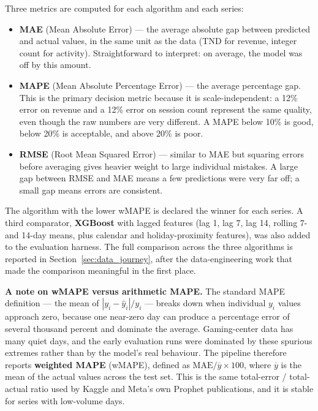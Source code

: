 Three metrics are computed for each algorithm and each series:

\begin{itemize}
  \item \textbf{MAE} (Mean Absolute Error) --- the average absolute gap between
        predicted and actual values, in the same unit as the data (TND for revenue,
        integer count for activity). Straightforward to interpret: on average, the
        model was off by this amount.
  \item \textbf{MAPE} (Mean Absolute Percentage Error) --- the average percentage gap.
        This is the primary decision metric because it is scale-independent: a 12\%
        error on revenue and a 12\% error on session count represent the same quality,
        even though the raw numbers are very different. A MAPE below 10\% is good,
        below 20\% is acceptable, and above 20\% is poor.
  \item \textbf{RMSE} (Root Mean Squared Error) --- similar to MAE but squaring errors
        before averaging gives heavier weight to large individual mistakes. A large gap
        between RMSE and MAE means a few predictions were very far off; a small gap
        means errors are consistent.
\end{itemize}

The algorithm with the lower wMAPE is declared the winner for each series. A third
comparator, \textbf{XGBoost} with lagged features (lag 1, lag 7, lag 14, rolling
7- and 14-day means, plus calendar and holiday-proximity features), was also added
to the evaluation harness. The full comparison across the three algorithms is
reported in Section~\ref{sec:data_journey}, after the data-engineering work that
made the comparison meaningful in the first place.

\medskip
\noindent\textbf{A note on wMAPE versus arithmetic MAPE.}
The standard MAPE definition --- the mean of $|y_i - \hat{y}_i| / y_i$ --- breaks down
when individual $y_i$ values approach zero, because one near-zero day can produce a
percentage error of several thousand percent and dominate the average. Gaming-center
data has many quiet days, and the early evaluation runs were dominated by these
spurious extremes rather than by the model's real behaviour. The pipeline therefore
reports \textbf{weighted MAPE} (wMAPE), defined as $\text{MAE} / \overline{y} \times 100$,
where $\overline{y}$ is the mean of the actual values across the test set. This is
the same total-error / total-actual ratio used by Kaggle and Meta's own Prophet
publications, and it is stable for series with low-volume days.

